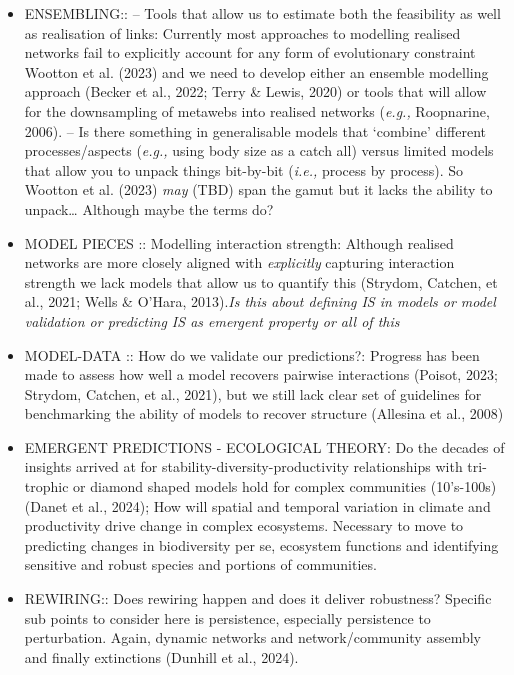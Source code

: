 \documentclass[
]{article}
\providecommand{\tightlist}{%
  \setlength{\itemsep}{0pt}\setlength{\parskip}{0pt}}
\begin{document}
\begin{itemize}
\tightlist
\item
  ENSEMBLING:: -- Tools that allow us to estimate both the feasibility
  as well as realisation of links: Currently most approaches to
  modelling realised networks fail to explicitly account for any form of
  evolutionary constraint Wootton et al. (2023) and we need to develop
  either an ensemble modelling approach (Becker et al., 2022; Terry \&
  Lewis, 2020) or tools that will allow for the downsampling of metawebs
  into realised networks (\emph{e.g.,} Roopnarine, 2006). -- Is there
  something in generalisable models that `combine' different
  processes/aspects (\emph{e.g.,} using body size as a catch all) versus
  limited models that allow you to unpack things bit-by-bit
  (\emph{i.e.,} process by process). So Wootton et al. (2023) \emph{may}
  (TBD) span the gamut but it lacks the ability to unpack\ldots{}
  Although maybe the terms do?
\item
  MODEL PIECES :: Modelling interaction strength: Although realised
  networks are more closely aligned with \emph{explicitly} capturing
  interaction strength we lack models that allow us to quantify this
  (Strydom, Catchen, et al., 2021; Wells \& O'Hara, 2013).\emph{Is this
  about defining IS in models or model validation or predicting IS as
  emergent property or all of this}
\item
  MODEL-DATA :: How do we validate our predictions?: Progress has been
  made to assess how well a model recovers pairwise interactions
  (Poisot, 2023; Strydom, Catchen, et al., 2021), but we still lack
  clear set of guidelines for benchmarking the ability of models to
  recover structure (Allesina et al., 2008)
\item
  EMERGENT PREDICTIONS - ECOLOGICAL THEORY: Do the decades of insights
  arrived at for stability-diversity-productivity relationships with
  tri-trophic or diamond shaped models hold for complex communities
  (10's-100s) (Danet et al., 2024); How will spatial and temporal
  variation in climate and productivity drive change in complex
  ecosystems. Necessary to move to predicting changes in biodiversity
  per se, ecosystem functions and identifying sensitive and robust
  species and portions of communities.
\item
  REWIRING:: Does rewiring happen and does it deliver robustness?
  Specific sub points to consider here is persistence, especially
  persistence to perturbation. Again, dynamic networks and
  network/community assembly and finally extinctions (Dunhill et al.,
  2024).
\end{itemize}
\end{document}
